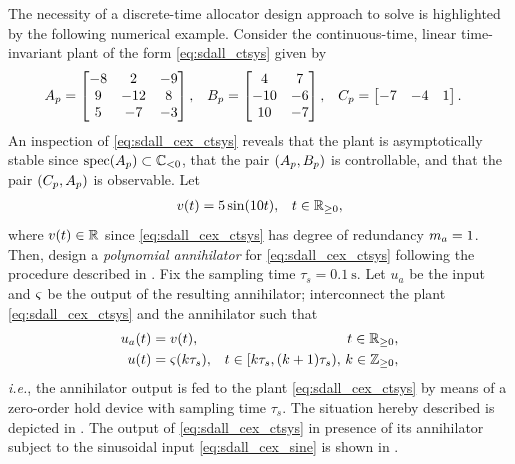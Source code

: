 \begin{example}
  \label{ex:sdall_ctann}
  The necessity of a discrete-time allocator design approach to solve  is highlighted by the following numerical example. Consider the continuous-time, linear time-invariant plant of the form \eqref{eq:sdall_ctsys} given by
  \begin{align}
    \label{eq:sdall_cex_ctsys}
    A_p &= \begin{bmatrix}
      -8 & 2 & -9\\
      9 & -12 & 8\\
      5 & -7 & -3
    \end{bmatrix}, & B_p &= \begin{bmatrix}
      4 & 7\\
      -10 & -6\\
      10 & -7
    \end{bmatrix}, & C_p &= \begin{bmatrix}
      -7 & -4 & 1
    \end{bmatrix}.
  \end{align}
  An inspection of \eqref{eq:sdall_cex_ctsys} reveals that the plant is asymptotically stable since $\operatorname{spec}(A_p)\subset\mathbb{C}_{< 0}$, that the pair $(A_p,B_p)$ is controllable, and that the pair $(C_p,A_p)$ is observable. Let
  \begin{align}
    \label{eq:sdall_cex_sine}
    v(t) &= 5\sin(10t), & t\in\mathbb{R}_{\geq 0},
  \end{align}
  where $v(t)\in\mathbb{R}$ since \eqref{eq:sdall_cex_ctsys} has degree of redundancy $m_a = 1$. Then, design a \emph{polynomial annihilator} for \eqref{eq:sdall_cex_ctsys} following the procedure described in . Fix the sampling time $\tau_s = \SI{0.1}{\second}$. Let $u_a$ be the input and $\varsigma$ be the output of the resulting annihilator; interconnect the plant \eqref{eq:sdall_cex_ctsys} and the annihilator such that
  \begin{align}
    \label{eq:sdall_cex_interconn}
    u_a(t) &= v(t), & t\in\mathbb{R}_{\geq 0},\\
    u(t) &= \varsigma(k\tau_s), & t\in [k\tau_s,(k+1)\tau_s),\,k\in\mathbb{Z}_{\geq 0},
  \end{align}
  \emph{i.e.}, the annihilator output is fed to the plant \eqref{eq:sdall_cex_ctsys} by means of a zero-order hold device with sampling time $\tau_s$. The situation hereby described is depicted in . The output of \eqref{eq:sdall_cex_ctsys} in presence of its annihilator subject to the sinusoidal input \eqref{eq:sdall_cex_sine} is shown in .

\end{example}
